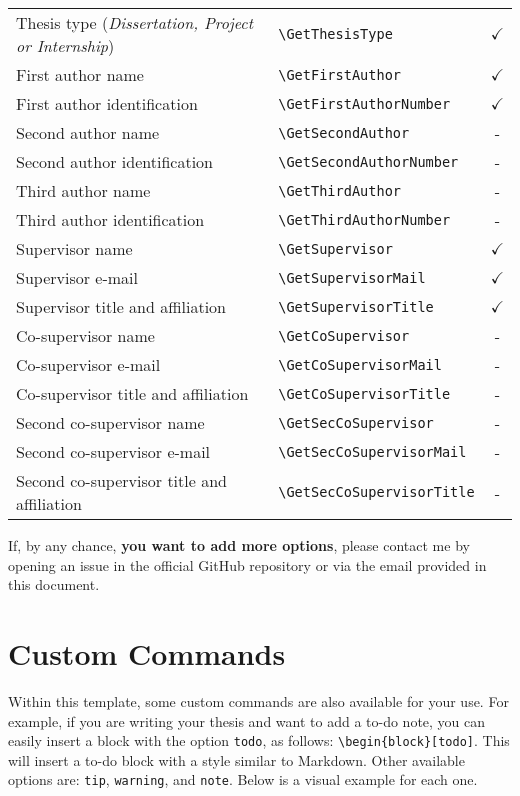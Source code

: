 {\begin{longtable}[c]{llc}
Thesis type (\footnotesize{\textit{Dissertation, Project or Internship}}) & \verb|\GetThesisType| & $\checkmark$ \\

First author name           & \verb|\GetFirstAuthor|        & $\checkmark$ \\
First author identification & \verb|\GetFirstAuthorNumber|  & $\checkmark$ \\ 

Second author name           & \verb|\GetSecondAuthor|          & - \\
Second author identification & \verb|\GetSecondAuthorNumber|    & - \\ 

Third author name           & \verb|\GetThirdAuthor|        & - \\
Third author identification & \verb|\GetThirdAuthorNumber|  & - \\ 

Supervisor name                  & \verb|\GetSupervisor|        & $\checkmark$ \\
Supervisor e-mail                & \verb|\GetSupervisorMail|    & $\checkmark$ \\
Supervisor title and affiliation & \verb|\GetSupervisorTitle|   & $\checkmark$ \\ 

Co-supervisor name                  & \verb|\GetCoSupervisor|       & - \\
Co-supervisor e-mail                & \verb|\GetCoSupervisorMail|   & - \\
Co-supervisor title and affiliation & \verb|\GetCoSupervisorTitle|  & - \\ 

Second co-supervisor name                   & \verb|\GetSecCoSupervisor|      & - \\
Second co-supervisor e-mail                 & \verb|\GetSecCoSupervisorMail|  & - \\
Second co-supervisor title and affiliation  & \verb|\GetSecCoSupervisorTitle| & - \\
\bottomrule
\end{longtable}

If, by any chance, \textbf{you want to add more options}, please contact me by opening an issue in the official GitHub repository or via the email provided in this document.

\section{Custom Commands}
Within this template, some custom commands are also available for your use. For example, if you are writing your thesis and want to add a to-do note, you can easily insert a block with the option \verb|todo|, as follows: \verb|\begin{block}[todo]|. This will insert a to-do block with a style similar to Markdown. Other available options are: \verb|tip|, \verb|warning|, and \verb|note|. Below is a visual example for each one.

}
